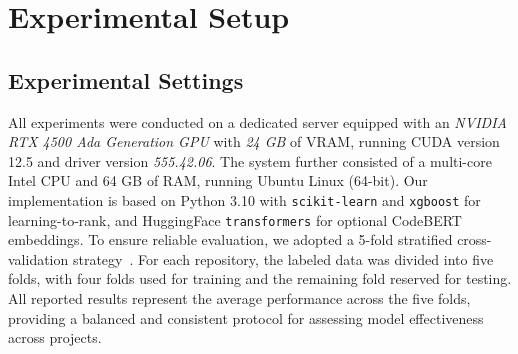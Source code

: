 \section{Experimental Setup}

\subsection{Experimental Settings}
All experiments were conducted on a dedicated server equipped with an \textit{NVIDIA RTX 4500 Ada Generation GPU} with \textit{24 GB} of VRAM, running CUDA version 12.5 and driver version \textit{555.42.06}. The system further consisted of a multi-core Intel CPU and 64 GB of RAM, running Ubuntu Linux (64-bit). Our implementation is based on Python 3.10 with \texttt{scikit-learn} and \texttt{xgboost} for learning-to-rank, and HuggingFace \texttt{transformers} for optional CodeBERT embeddings. To ensure reliable evaluation, we adopted a 5-fold stratified cross-validation strategy~\cite{stone1974cross}. For each repository, the labeled data was divided into five folds, with four folds used for training and the remaining fold reserved for testing. All reported results represent the average performance across the five folds, providing a balanced and consistent protocol for assessing model effectiveness across projects.










